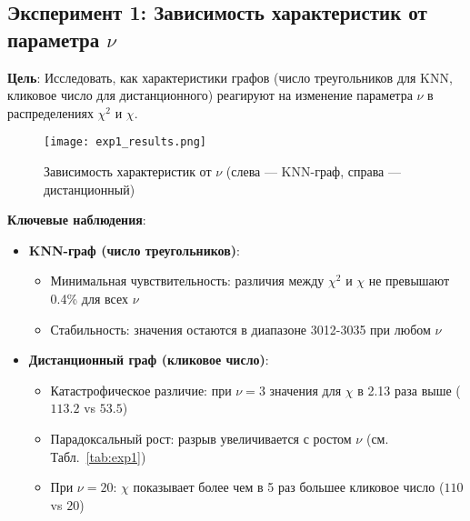 \documentclass[a4paper, 12pt]{article}
\begin{document}
\subsection{Эксперимент 1: Зависимость характеристик от параметра $\nu$}
\label{exp1}

\textbf{Цель}: Исследовать, как характеристики графов (число треугольников для KNN, кликовое число для дистанционного) реагируют на изменение параметра $\nu$ в распределениях $\chi^2$ и $\chi$.

\begin{figure}[H]
    \centering
    \texttt{[image: exp1\_results.png]}
    \caption{Зависимость характеристик от $\nu$ (слева — KNN-граф, справа — дистанционный)}
    \label{fig:exp1}
\end{figure}

\textbf{Ключевые наблюдения}:
\begin{itemize}
    \item \textbf{KNN-граф (число треугольников)}:
        \begin{itemize}
            \item Минимальная чувствительность: различия между $\chi^2$ и $\chi$ не превышают 0.4\% для всех $\nu$
            \item Стабильность: значения остаются в диапазоне 3012-3035 при любом $\nu$
        \end{itemize}
        
    \item \textbf{Дистанционный граф (кликовое число)}:
        \begin{itemize}
            \item Катастрофическое различие: при $\nu=3$ значения для $\chi$ в 2.13 раза выше ($113.2$ vs $53.5$)
            \item Парадоксальный рост: разрыв увеличивается с ростом $\nu$ (см. Табл.~\ref{tab:exp1})
            \item При $\nu=20$: $\chi$ показывает более чем в 5 раз большее кликовое число ($110$ vs $20$)
        \end{itemize}
\end{itemize}
\end{document}

